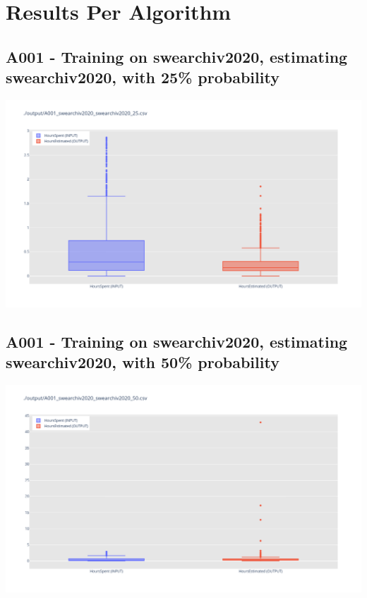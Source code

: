 \newpage{}

\hypertarget{results-per-algorithm}{%
\section{Results Per Algorithm}\label{results-per-algorithm}}



\newpage

\subsection{A001 - Training on swearchiv2020, estimating swearchiv2020, with 25\% probability}

\includegraphics[width=\textwidth]{Scripts/output/A001_swearchiv2020_swearchiv2020_25.csv.png}

\newpage

\subsection{A001 - Training on swearchiv2020, estimating swearchiv2020, with 50\% probability}

\includegraphics[width=\textwidth]{Scripts/output/A001_swearchiv2020_swearchiv2020_50.csv.png}

